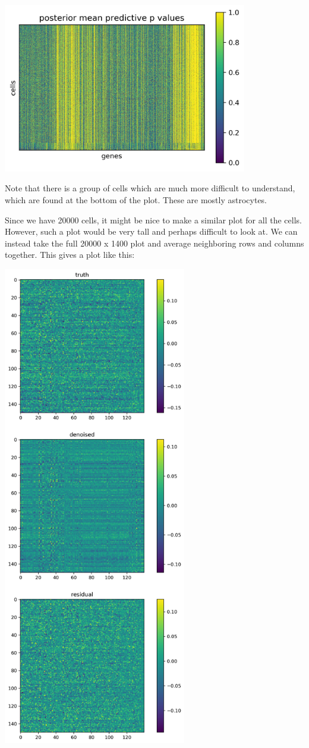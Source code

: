 \includegraphics[width=0.8\textwidth]{pics/resids}

Note that there is a group of cells which are much more difficult to understand, which are found at the bottom of the plot.  These are mostly astrocytes.

Since we have 20000 cells, it might be nice to make a similar plot for all the cells.  However, such a plot would be very tall and perhaps difficult to look at.  We can instead take the full 20000 x 1400 plot and average neighboring rows and columns together.  This gives a plot like this:

\includegraphics[width=0.6\textwidth]{pics/residsfull}

